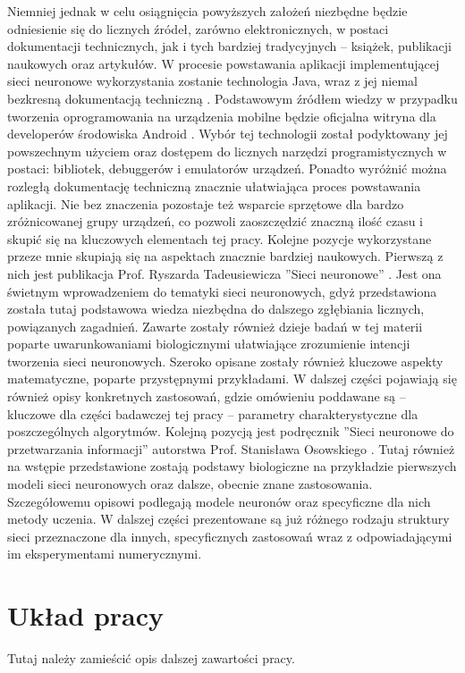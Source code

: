 Niemniej jednak w celu osiągnięcia powyższych założeń niezbędne będzie odniesienie się do licznych źródeł, zarówno elektronicznych, w postaci dokumentacji technicznych, jak i tych bardziej tradycyjnych -- książek, publikacji naukowych oraz artykułów. W procesie powstawania aplikacji implementującej sieci neuronowe wykorzystania zostanie technologia Java, wraz z jej niemal bezkresną dokumentacją techniczną \cite{java}. Podstawowym źródłem wiedzy w przypadku tworzenia oprogramowania na urządzenia mobilne będzie oficjalna witryna dla developerów środowiska Android \cite{android}. Wybór tej technologii został podyktowany jej powszechnym użyciem oraz dostępem do licznych narzędzi programistycznych w postaci: bibliotek, debuggerów i emulatorów urządzeń. Ponadto wyróżnić można rozległą dokumentację techniczną znacznie ułatwiająca proces powstawania aplikacji. Nie bez znaczenia pozostaje też wsparcie sprzętowe dla bardzo zróżnicowanej grupy urządzeń, co pozwoli zaoszczędzić znaczną ilość czasu i skupić się na kluczowych elementach tej pracy. Kolejne pozycje wykorzystane przeze mnie skupiają się na aspektach znacznie bardziej naukowych. Pierwszą z nich jest publikacja Prof. Ryszarda Tadeusiewicza ''Sieci neuronowe'' \cite{Tad93}. Jest ona świetnym wprowadzeniem do tematyki sieci neuronowych, gdyż przedstawiona została tutaj podstawowa wiedza niezbędna do dalszego zgłębiania licznych, powiązanych zagadnień. Zawarte zostały również dzieje badań w tej materii poparte uwarunkowaniami biologicznymi ułatwiające zrozumienie intencji tworzenia sieci neuronowych. Szeroko opisane zostały również kluczowe aspekty matematyczne, poparte przystępnymi przykładami. W dalszej części pojawiają się również opisy konkretnych zastosowań, gdzie omówieniu poddawane są -- kluczowe dla części badawczej tej pracy -- parametry charakterystyczne dla poszczególnych algorytmów. Kolejną pozycją jest podręcznik ''Sieci neuronowe do przetwarzania informacji'' autorstwa Prof. Stanisława Osowskiego \cite{Oso06}. Tutaj również na wstępie przedstawione zostają podstawy biologiczne na przykładzie pierwszych modeli sieci neuronowych oraz dalsze, obecnie znane zastosowania. Szczegółowemu opisowi podlegają modele neuronów oraz specyficzne dla nich metody uczenia. W dalszej części prezentowane są już różnego rodzaju struktury sieci przeznaczone dla innych, specyficznych zastosowań wraz z odpowiadającymi im eksperymentami numerycznymi.

\section{Układ pracy}
\iffalse
{\color{red} Tutaj należy zamieścić opis dalszej zawartości pracy.}

